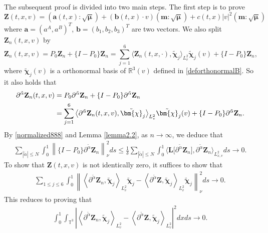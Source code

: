 \documentclass[reqno]{amsart}
\numberwithin{equation}{section}
\numberwithin{equation}{section}
\begin{document}
		The subsequent proof is divided into two main steps.
		The first step is to prove 
		\begin{equation*}
		 \mathbf{Z}(t,x,v) = (\mathbf{a}(t,x):\sqrt{\bm{\mu}}) + (\mathbf{b}(t,x) \cdot v) (\mathbf{m}:\sqrt{\bm{\mu}}) + c(t,x)|v|^2(\mathbf{m}:\sqrt{\bm{\mu}})
		\end{equation*}
		where $\mathbf{a}=(a^A,a^B)^T$, $\mathbf{b}=(b_1,b_2,b_3)^T$ are two vectors. We also split $ \mathbf{Z}_n(t,x,v) $ by
		$$
		\mathbf{Z}_n(t,x,v) = P_0 \mathbf{Z}_n + \{I - P_0\}\mathbf{Z}_n = \sum_{j=1}^6 \big\langle \mathbf{Z}_n(t,x,\cdot), \tilde{\bm{\chi}}_j \big\rangle_{L^{2}_{v}} \tilde{\bm{\chi}}_j(v) + \{I - P_0\}\mathbf{Z}_n,
		$$
		where $\tilde{\bm{\chi}}_j(v)$ is a orthonormal basis of $\mathbb{R}^3(v)$ defined in \eqref{deforthonormalB}. So it also holds that
		\begin{align}
			\partial^{\tilde{\alpha}} \mathbf{Z}_n(t,x,v) &= P_0 \partial^{\tilde{\alpha}} \mathbf{Z}_n + \{I - P_0\}\partial^{\tilde{\alpha}} \mathbf{Z}_n \notag \\
			&= \sum_{j=1}^6 \big\langle \partial^{\tilde{\alpha}} \mathbf{Z}_n(t,x,v), \tilde{\bm{\chi}}_j \big\rangle_{L^{2}_{v}} \tilde{\bm{\chi}}_j(v) + \{I - P_0\}\partial^{\tilde{\alpha}} \mathbf{Z}_n. \label{socade9393}
		\end{align}
		By \eqref{normalized888} and Lemma \ref{lemma2.2}, as $n\rightarrow \infty$, we deduce that
		\begin{align}
		\sum_{|{\tilde{\alpha}}| \leq N} \int_{0}^{1} \left\| \{I - P_{0}\} \partial^{\tilde{\alpha}} \mathbf{Z}_{n} \right\|_{\nu}^{2} ds \leq \frac{1}{\delta} \sum_{|{\tilde{\alpha}}| \leq N} \int_{0}^{1} \big\langle \mathbf{L}\big[\partial^{\tilde{\alpha}} \mathbf{Z}_{n}\big], \partial^{\tilde{\alpha}} \mathbf{Z}_{n} \big\rangle_{L^{2}_{x,v}} ds \to 0. \label{socade9494}
		\end{align}
		To show that $ \mathbf{Z}(t, x, v) $  is not identically zero, it suffices to show that
		\begin{align}
		\sum_{1 \leq j \leq 6} \int_{0}^{1} \left\| \left\langle \partial^{\tilde{\alpha}} \mathbf{Z}_{n}, \tilde{\bm{\chi}}_j \right\rangle_{L^{2}_{v}} \tilde{\bm{\chi}}_j - \left\langle \partial^{\tilde{\alpha}} \mathbf{Z}, \tilde{\bm{\chi}}_j \right\rangle_{L^{2}_{v}} \tilde{\bm{\chi}}_j \right\|_{\nu}^{2} ds \to 0. \label{socade9595}
		\end{align}
		This reduces to proving that
		\begin{align}
		\int_{0}^{1} \int_{\mathbb{T}^{3}} \left| \left\langle \partial^{\tilde{\alpha}} \mathbf{Z}_{n}, \tilde{\bm{\chi}}_j \right\rangle_{L^{2}_{v}} - \left\langle \partial^{\tilde{\alpha}} \mathbf{Z}, \tilde{\bm{\chi}}_j \right\rangle_{L^{2}_{v}} \right|^{2} dxds \to 0. \label{socade9696}
		\end{align}
\end{document}
